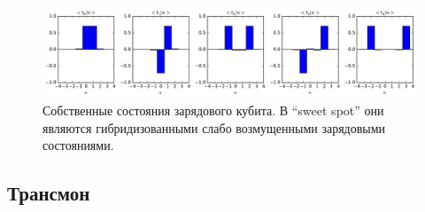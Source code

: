 \documentclass[12pt, twoside]{report}
\numberwithin{equation}{section}
\numberwithin{figure}{section}
\begin{document}
\begin{figure}[!h]
\centering
\includegraphics[width = 1\textwidth]{Pictures2/charge_2_eigenstates}
\caption{Собственные состояния зарядового кубита. В ``sweet spot'' они являются гибридизованными слабо возмущенными зарядовыми состояниями. }
\label{fig:charge-eigenstates}

\end{figure}

\pagebreak
\vfill
\subsection{Трансмон} \label{chap:transmon}
\end{document}
